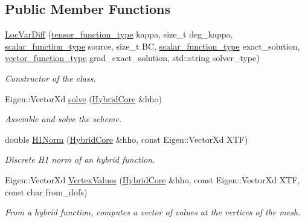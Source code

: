 \subsection*{Public Member Functions}
\begin{DoxyCompactItemize}
\item 
\hyperlink{group__HHO__locvar_ga3e1466c2595b771c1afd4f73ec5f27bc}{Loc\+Var\+Diff} (\hyperlink{classHArDCore2D_1_1LocVarDiff_a68ac1fa2f65fa77a2f21c8ff28f8c36f}{tensor\+\_\+function\+\_\+type} kappa, size\+\_\+t deg\+\_\+kappa, \hyperlink{classHArDCore2D_1_1LocVarDiff_a1bb6dadd227f308545e68ec2b18d457c}{scalar\+\_\+function\+\_\+type} source, size\+\_\+t BC, \hyperlink{classHArDCore2D_1_1LocVarDiff_a1bb6dadd227f308545e68ec2b18d457c}{scalar\+\_\+function\+\_\+type} exact\+\_\+solution, \hyperlink{classHArDCore2D_1_1LocVarDiff_a44128fac430109885d14ac8582a68809}{vector\+\_\+function\+\_\+type} grad\+\_\+exact\+\_\+solution, std\+::string solver\+\_\+type)
\begin{DoxyCompactList}\small\item\em Constructor of the class. \end{DoxyCompactList}\item 
Eigen\+::\+Vector\+Xd \hyperlink{group__HHO__locvar_ga80c75c7c386169ef8b96763a36dd2a92}{solve} (\hyperlink{classHArDCore2D_1_1HybridCore}{Hybrid\+Core} \&hho)
\begin{DoxyCompactList}\small\item\em Assemble and solve the scheme. \end{DoxyCompactList}\item 
double \hyperlink{group__HHO__locvar_ga42adf784c096036d90422baa41fc17c2}{H1\+Norm} (\hyperlink{classHArDCore2D_1_1HybridCore}{Hybrid\+Core} \&hho, const Eigen\+::\+Vector\+Xd X\+TF)
\begin{DoxyCompactList}\small\item\em Discrete H1 norm of an hybrid function. \end{DoxyCompactList}\item 
Eigen\+::\+Vector\+Xd \hyperlink{group__HHO__locvar_ga60a0da4f13e1da374bc3d686004ab439}{Vertex\+Values} (\hyperlink{classHArDCore2D_1_1HybridCore}{Hybrid\+Core} \&hho, const Eigen\+::\+Vector\+Xd X\+TF, const char from\+\_\+dofs)
\begin{DoxyCompactList}\small\item\em From a hybrid function, computes a vector of values at the vertices of the mesh. \end{DoxyCompactList}\item 

\end{DoxyCompactItemize}

